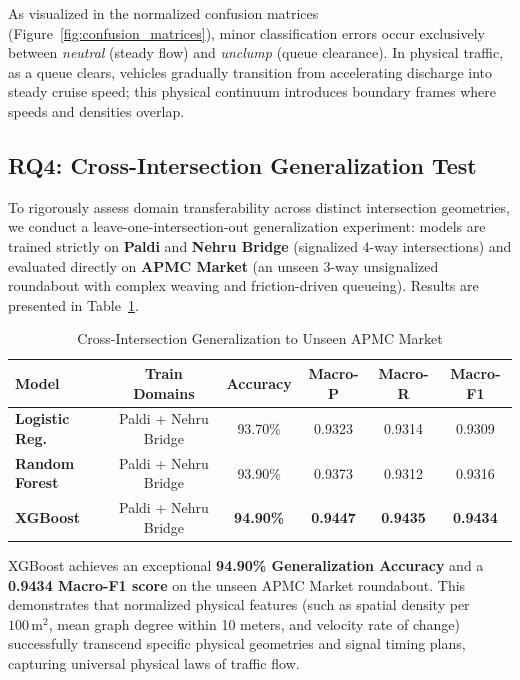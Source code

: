 \documentclass[conference]{IEEEtran}
\begin{document}
As visualized in the normalized confusion matrices (Figure~\ref{fig:confusion_matrices}), minor classification errors occur exclusively between \textit{neutral} (steady flow) and \textit{unclump} (queue clearance). In physical traffic, as a queue clears, vehicles gradually transition from accelerating discharge into steady cruise speed; this physical continuum introduces boundary frames where speeds and densities overlap.

\subsection{RQ4: Cross-Intersection Generalization Test}
To rigorously assess domain transferability across distinct intersection geometries, we conduct a leave-one-intersection-out generalization experiment: models are trained strictly on \textbf{Paldi} and \textbf{Nehru Bridge} (signalized 4-way intersections) and evaluated directly on \textbf{APMC Market} (an unseen 3-way unsignalized roundabout with complex weaving and friction-driven queueing). Results are presented in Table~\ref{tab:cross_intersection}.

\begin{table}[htbp]
\caption{Cross-Intersection Generalization to Unseen APMC Market}
\label{tab:cross_intersection}
\centering
\begin{tabular}{lccccc}
\toprule
\textbf{Model} & \textbf{Train Domains} & \textbf{Accuracy} & \textbf{Macro-P} & \textbf{Macro-R} & \textbf{Macro-F1} \\
\midrule
\textbf{Logistic Reg.} & Paldi + Nehru Bridge & 93.70\% & 0.9323 & 0.9314 & 0.9309 \\
\textbf{Random Forest} & Paldi + Nehru Bridge & 93.90\% & 0.9373 & 0.9312 & 0.9316 \\
\textbf{XGBoost}       & Paldi + Nehru Bridge & \textbf{94.90\%} & \textbf{0.9447} & \textbf{0.9435} & \textbf{0.9434} \\
\bottomrule
\end{tabular}
\end{table}

XGBoost achieves an exceptional \textbf{94.90\% Generalization Accuracy} and a \textbf{0.9434 Macro-F1 score} on the unseen APMC Market roundabout. This demonstrates that normalized physical features (such as spatial density per $100\,\text{m}^2$, mean graph degree within 10 meters, and velocity rate of change) successfully transcend specific physical geometries and signal timing plans, capturing universal physical laws of traffic flow.
\end{document}
